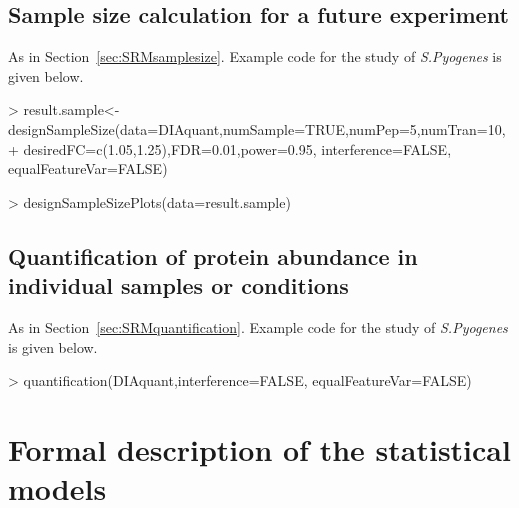 \documentclass[11pt]{article}
\def\secref#1{Section~\ref{sec:#1}}
\begin{document}
\subsection{Sample size calculation for a future experiment}

As in \secref{SRMsamplesize}. Example code for the study of {\it S.Pyogenes} is given below. 

\begin{small}
\begin{Schunk}
\begin{Sinput}
> result.sample<-designSampleSize(data=DIAquant,numSample=TRUE,numPep=5,numTran=10,
+   desiredFC=c(1.05,1.25),FDR=0.01,power=0.95, interference=FALSE, equalFeatureVar=FALSE)
\end{Sinput}
\end{Schunk}
\end{small}

\begin{small}
\begin{Schunk}
\begin{Sinput}
> designSampleSizePlots(data=result.sample)
\end{Sinput}
\end{Schunk}
\end{small}

\subsection{Quantification of protein abundance in individual samples or conditions}

As in \secref{SRMquantification}. Example code for the study of {\it S.Pyogenes} is given below. 

\begin{small}
\begin{Schunk}
\begin{Sinput}
> quantification(DIAquant,interference=FALSE, equalFeatureVar=FALSE)
\end{Sinput}
\end{Schunk}
\end{small}


\vspace{0.3in}

\clearpage
\section{Formal description of the statistical models \label{sec:formalStats}}
\end{document}
